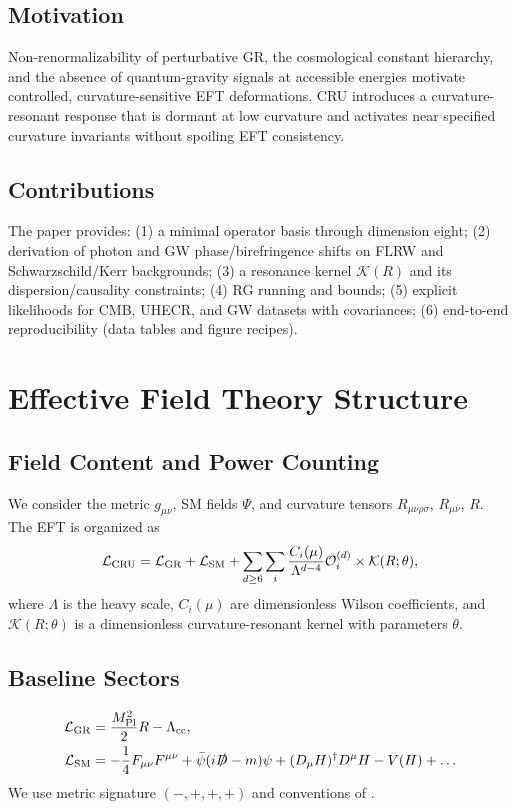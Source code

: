 \documentclass[12pt,a4paper,oneside]{scrbook}
\theoremstyle{definition}
\theoremstyle{remark}
\newcommand{\mpl}{M_{\mathrm{Pl}}}
\newcommand{\Lag}{\mathcal{L}}
\newcommand{\K}{\mathcal{K}}
\begin{document}
\section{Motivation}
\label{sec:motivation}
Non-renormalizability of perturbative GR, the cosmological constant hierarchy, and the absence of quantum-gravity signals at accessible energies motivate controlled, curvature-sensitive EFT deformations. CRU introduces a curvature-resonant response that is dormant at low curvature and activates near specified curvature invariants without spoiling EFT consistency.
\section{Contributions}
\label{sec:contributions}
The paper provides: (1) a minimal operator basis through dimension eight; (2) derivation of photon and GW phase/birefringence shifts on FLRW and Schwarzschild/Kerr backgrounds; (3) a resonance kernel $\K(R)$ and its dispersion/causality constraints; (4) RG running and bounds; (5) explicit likelihoods for CMB, UHECR, and GW datasets with covariances; (6) end-to-end reproducibility (data tables and figure recipes).
\chapter{Effective Field Theory Structure}
\section{Field Content and Power Counting}
\label{sec:fieldcontent}
We consider the metric $g_{\mu\nu}$, SM fields $\Psi$, and curvature tensors $R_{\mu\nu\rho\sigma}$, $R_{\mu\nu}$, $R$. The EFT is organized as
\begin{equation}
\Lag_{\rm CRU}=\Lag_{\rm GR}+\Lag_{\rm SM}+\sum_{d\ge 6}\sum_i \frac{C_i(\mu)}{\Lambda^{d-4}} \mathcal{O}_i^{(d)}\times \K(R;\theta),
\label{eq:LCRU}
\end{equation}
where $\Lambda$ is the heavy scale, $C_i(\mu)$ are dimensionless Wilson coefficients, and $\K(R;\theta)$ is a dimensionless curvature-resonant kernel with parameters $\theta$.
\section{Baseline Sectors}
\label{sec:baseline}
\begin{align}
\Lag_{\rm GR} &= \frac{\mpl^2}{2}R - \Lambda_{\rm cc},\\
\Lag_{\rm SM} &= -\frac{1}{4}F_{\mu\nu}F^{\mu\nu}+\bar\psi(i\slashed{D}-m)\psi + (D_\mu H)^\dagger D^\mu H - V(H)+\ldots
\end{align}
We use metric signature $(-,+,+,+)$ and conventions of \citet{WeinbergQFT2}.
\end{document}

